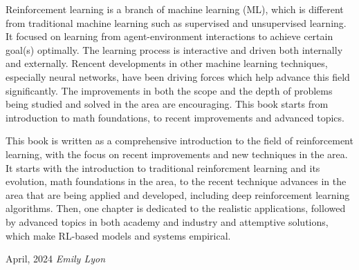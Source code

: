 %
%

\preface
\vspace{-\baselineskip}
\vspace{-\baselineskip}
\vspace{-\baselineskip}
\vspace{-\baselineskip}
\vspace{-\baselineskip}
\vspace{-\baselineskip}
\vspace{-\baselineskip}
\vspace{-\baselineskip}
Reinforcement learning is a branch of machine learning (ML), which is different from traditional machine learning such as supervised and unsupervised learning. 
It focused on learning from agent-environment interactions to achieve certain goal(s) optimally. The learning process is interactive and driven both internally and externally.
Rencent developments in other machine learning techniques, especially neural networks, have been driving forces which help advance this field significantly. 
The improvements in both the scope and the depth of problems being studied and solved in the area are encouraging.
This book starts from introduction to math foundations, to recent improvements and advanced topics.
\vspace{\baselineskip}


\noindent This book is written as a comprehensive introduction to the field of reinforcement learning, with the focus on recent improvements and new techniques in the area. 
It starts with the introduction to traditional reinforcment learning and its evolution, math foundations in the area, to the recent technique advances in the area 
that are being applied and developed, including deep reinforcement learning algorithms. Then, one chapter is dedicated to the realistic applications,
followed by advanced topics in both academy and industry and attemptive solutions, which make RL-based models and systems empirical.



\vspace{\baselineskip}
\begin{flushright}\noindent
April, 2024 \hfill {\it Emily Lyon}\\
\end{flushright}


